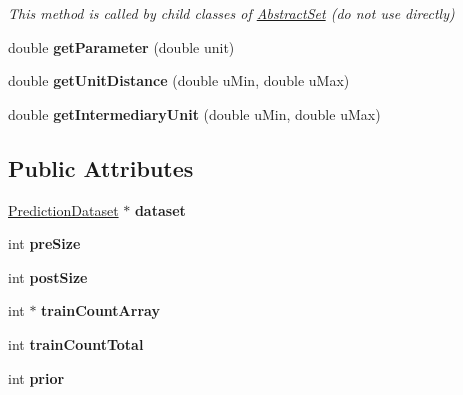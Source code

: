 \begin{DoxyCompactItemize}
\begin{DoxyCompactList}\small\item\em This method is called by child classes of \hyperlink{classAbstractSet}{Abstract\-Set} (do not use directly) \end{DoxyCompactList}\item 
\hypertarget{classLogarithmicScore_a33390a7d2b8a14ef7f2e6300a22a4c0b}{double {\bfseries get\-Parameter} (double unit)}\label{classLogarithmicScore_a33390a7d2b8a14ef7f2e6300a22a4c0b}

\item 
\hypertarget{classLogarithmicScore_a123c27f97bfa6071da1f51f39b897bcb}{double {\bfseries get\-Unit\-Distance} (double u\-Min, double u\-Max)}\label{classLogarithmicScore_a123c27f97bfa6071da1f51f39b897bcb}

\item 
\hypertarget{classLogarithmicScore_a40576f47008aa6ab69d95535c0a5fa79}{double {\bfseries get\-Intermediary\-Unit} (double u\-Min, double u\-Max)}\label{classLogarithmicScore_a40576f47008aa6ab69d95535c0a5fa79}

\end{DoxyCompactItemize}
\subsection*{Public Attributes}
\begin{DoxyCompactItemize}
\item 
\hypertarget{classLogarithmicScore_afc0e37fc64d6dc1742120ea6b940fd0f}{\hyperlink{classPredictionDataset}{Prediction\-Dataset} $\ast$ {\bfseries dataset}}\label{classLogarithmicScore_afc0e37fc64d6dc1742120ea6b940fd0f}

\item 
\hypertarget{classLogarithmicScore_ab6a0f495948bbb7d877064baef838993}{int {\bfseries pre\-Size}}\label{classLogarithmicScore_ab6a0f495948bbb7d877064baef838993}

\item 
\hypertarget{classLogarithmicScore_addfd4b0d086013c199a424628450f64b}{int {\bfseries post\-Size}}\label{classLogarithmicScore_addfd4b0d086013c199a424628450f64b}

\item 
\hypertarget{classLogarithmicScore_a801f0da7f5ba568bf727387144cac392}{int $\ast$ {\bfseries train\-Count\-Array}}\label{classLogarithmicScore_a801f0da7f5ba568bf727387144cac392}

\item 
\hypertarget{classLogarithmicScore_ace0a8c93c27c83a3f209b1faf7fdb24e}{int {\bfseries train\-Count\-Total}}\label{classLogarithmicScore_ace0a8c93c27c83a3f209b1faf7fdb24e}

\item 
\hypertarget{classLogarithmicScore_a0a221889c0e7f4c3a1ba3fd80b1f3603}{int {\bfseries prior}}\label{classLogarithmicScore_a0a221889c0e7f4c3a1ba3fd80b1f3603}

\end{DoxyCompactItemize}



